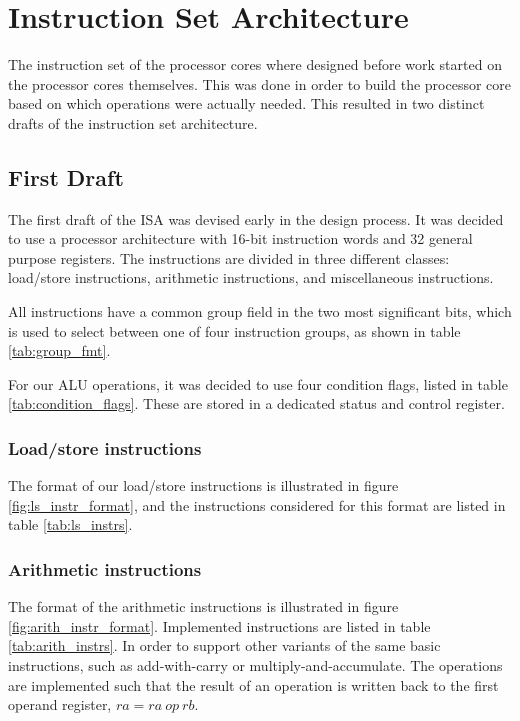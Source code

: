 \section{Instruction Set Architecture}\label{section:fpga-isa}

The instruction set of the processor cores where designed before work
started on the processor cores themselves. This was done in order
to build the processor core based on which operations were actually
needed. This resulted in two distinct drafts of the instruction set
architecture.

\subsection{First Draft}
The first draft of the ISA was devised early in the design process.
It was decided to use a processor architecture with 16-bit instruction words
and 32 general purpose registers. The instructions are divided in three
different classes: load/store instructions, arithmetic instructions, and
miscellaneous instructions.

All instructions have a common group field in the two most significant bits,
which is used to select between one of four instruction groups, as shown in
table \ref{tab:group_fmt}.

For our ALU operations, it was decided to use four condition flags, listed in
table \ref{tab:condition_flags}. These are stored in a dedicated status and
control register.




\subsubsection{Load/store instructions}
The format of our load/store instructions is illustrated in figure
\ref{fig:ls_instr_format}, and the instructions considered for this format
are listed in table \ref{tab:ls_instrs}.




\subsubsection{Arithmetic instructions}
The format of the arithmetic instructions is illustrated in figure
\ref{fig:arith_instr_format}.
Implemented instructions are listed in table \ref{tab:arith_instrs}. In order
to support other variants of the same basic instructions, such as add-with-carry
or multiply-and-accumulate. The operations are implemented such that the result
of an operation is written back to the first operand register, $ra = ra~op~rb$.

